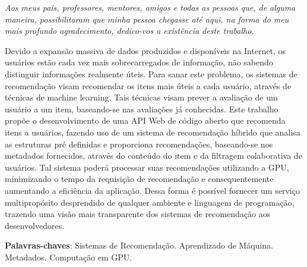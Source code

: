 \documentclass[12pt, openright, oneside, a4paper, brazil]{abntex2}
\begin{document}
\begin{dedicatoria}
	\vspace*{\fill}
	\centering
	\noindent

	\textit{Aos meus pais, professores, mentores, amigos e todas as pessoas que, de alguma maneira, possibilitaram que minha pessoa chegasse até aqui, na forma do meu mais profundo agradecimento, dedico-vos a existência deste trabalho.}

	\vspace*{\fill}
 \end{dedicatoria}

\setlength{\absparsep}{18pt} %
\begin{resumo}

Devido a expansão massiva de dados produzidos e disponíveis na Internet, os usuários estão cada vez mais sobrecarregados de informação, não sabendo distinguir informações realmente úteis. Para sanar este problema, os sistemas de recomendação visam recomendar os itens mais úteis a cada usuário, através de técnicas de machine learning. Tais técnicas visam prever a avaliação de um usuário a um item, baseando-se nas avaliações já conhecidas. Este trabalho propõe o desenvolvimento de uma API Web de código aberto que recomenda itens a usuários, fazendo uso de um sistema de recomendação híbrido que analisa as estruturas pré definidas e proporciona recomendações, baseando-se nos metadados fornecidos, através do conteúdo do item e da filtragem colaborativa de usuários. Tal sistema poderá processar suas recomendações utilizando a GPU, minimizando o tempo da requisição de recomendação e consequentemente aumentando a eficiência da aplicação. Dessa forma é possível fornecer um serviço multipropósito desprendido de qualquer ambiente e linguagem de programação, trazendo uma visão mais transparente dos sistemas de recomendação aos desenvolvedores.

\textbf{Palavras-chaves}: Sistemas de Recomendação. Aprendizado de Máquina. Metadados. Computação em GPU.
\end{resumo}
\end{document}
